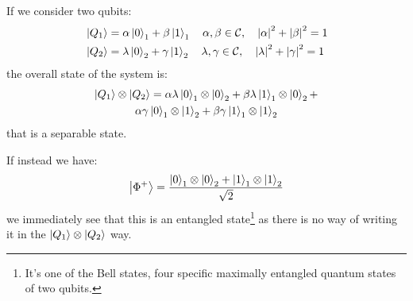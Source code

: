 
If we consider two qubits:
\begin{align*}
    &\ket{Q_1} = \alpha\ket{0}_1 + \beta\ket{1}_1 \quad \alpha,\beta \in \mathcal{C}, \quad \abs{\alpha}^2 + \abs{\beta}^2 = 1 \\
    &\ket{Q_2} = \lambda\ket{0}_2 + \gamma\ket{1}_2 \quad \lambda,\gamma \in \mathcal{C}, \quad \abs{\lambda}^2 + \abs{\gamma}^2 = 1
\end{align*}
the overall state of the system is:
\begin{multline*}
    \ket{Q_1} \otimes \ket{Q_2} = \alpha \lambda \ket{0}_1 \otimes \ket{0}_2 +  \beta \lambda  \ket{1}_1 \otimes \ket{0}_2 + \\ 
    \alpha \gamma \ket{0}_1 \otimes \ket{1}_2 + \beta \gamma \ket{1}_1 \otimes \ket{1}_2
\end{multline*}
that is a separable state.

If instead we have:
\begin{equation*}
    \ket{\Phi^+} = \frac{\ket{0}_1 \otimes \ket{0}_2 + \ket{1}_1 \otimes \ket{1}_2}{\sqrt{2}}
\end{equation*}
we immediately see that this is an entangled state\footnote{It's one of the Bell states, four specific maximally entangled quantum states of two qubits.} as there is no way of writing it in the $\ket{Q_1} \otimes \ket{Q_2}$ way. 